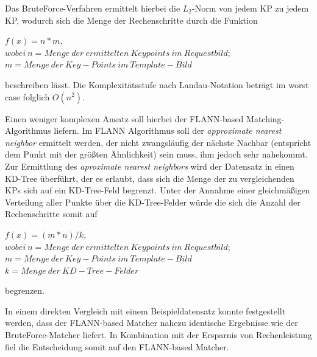 \documentclass[
    type=Prakikumsbericht,
    status=draft, %
    language=german, %
    bibengine=bibtex,
]{unibwm-inf-thesis}
\begin{document}
    Das BruteForce-Verfahren ermittelt hierbei die $L_{2}$-Norm von jedem \ac{KP} zu jedem \ac{KP}, wodurch sich die Menge der Rechenschritte durch die Funktion
\begin{center}
    $f(x) = n * m,$ \\
    $wobei~n= Menge~der~ermittelten~Keypoints~im~Requestbild;$\\
    $m = Menge~der~Key-Points~im~Template-Bild$\\
\end{center}
    beschreiben lässt.
    Die Komplexitätsstufe nach Landau-Notation beträgt im worst case folglich $O(n^{2})$.

    Einen weniger komplexen Ansatz soll hierbei der \ac{FLANN}-based Matching-Algorithmus liefern.
    Im \ac{FLANN} Algorithmus soll der \textit{approximate nearest neighbor} ermittelt werden, der nicht zwangsläufig der nächste Nachbar (entspricht dem Punkt mit der größten Ähnlichkeit) sein muss,
    ihm jedoch sehr nahekommt.
    Zur Ermittlung des \textit{aproximate nearest neighbors} wird der Datensatz in einen KD-Tree überführt, der es erlaubt, dass sich die Menge der zu vergleichenden \acp{KP} sich auf ein KD-Tree-Feld begrenzt.
    Unter der Annahme einer gleichmäßigen Verteilung aller Punkte über die KD-Tree-Felder würde die sich die Anzahl der Rechenschritte somit auf
    \begin{center}
        $f(x) = (m*n) / k, $ \\
        $wobei~n= Menge~der~ermittelten~Keypoints~im~Requestbild;$\\
        $m = Menge~der~Key-Points~im~Template-Bild$\\
        $k = Menge~der~KD-Tree-Felder$\\
    \end{center}
    begrenzen.

    In einem direkten Vergleich mit einem Beispieldatensatz konnte festgestellt werden, dass der \ac{FLANN}-based Matcher nahezu identische Ergebnisse wie der BruteForce-Matcher liefert.
    In Kombination mit der Ersparnis von Rechenleistung fiel die Entscheidung somit auf den \ac{FLANN}-based Matcher.\\
\end{document}
